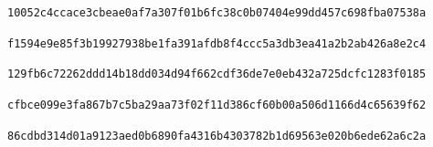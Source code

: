 \documentclass[11pt]{amsart}
\theoremstyle{definition}
\theoremstyle{remark}
\begin{document}
\par
\texttt{10052c4ccace3cbeae0af7a307f01b6fc38c0b07404e99dd457c698fba07538a}\par\vspace{3pt}
\par
\texttt{f1594e9e85f3b19927938be1fa391afdb8f4ccc5a3db3ea41a2b2ab426a8e2c4}\par\vspace{3pt}
\par
\texttt{129fb6c72262ddd14b18dd034d94f662cdf36de7e0eb432a725dcfc1283f0185}\par\vspace{3pt}
\par
\texttt{cfbce099e3fa867b7c5ba29aa73f02f11d386cf60b00a506d1166d4c65639f62}\par\vspace{3pt}
\par
\texttt{86cdbd314d01a9123aed0b6890fa4316b4303782b1d69563e020b6ede62a6c2a}\par
\endgroup
\par\vspace{4pt}
\end{document}
